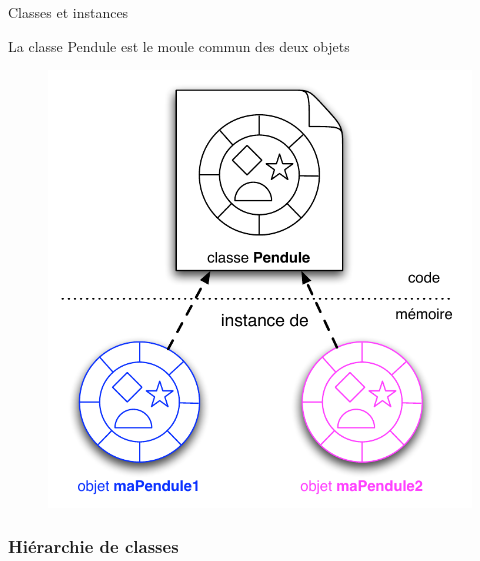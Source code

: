 \begin{frame}{Classes et instances}
\begin{center}
	La classe Pendule est le moule commun des deux objets
\end{center}
  \begin{figure}[htbp]
    \begin{center}
      \includegraphics[scale=.37]{fig/instances.pdf}
    \end{center}
  \end{figure}
\end{frame}

\subsubsection*{Hiérarchie de classes}

